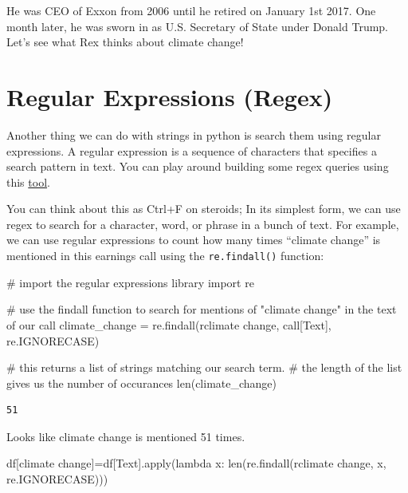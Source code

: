 \documentclass[
  letterpaper,
  DIV=11,
  numbers=noendperiod]{scrreprt}
\newenvironment{Shaded}{\begin{snugshade}}{\end{snugshade}}
\newcommand{\BuiltInTok}[1]{\textcolor[rgb]{0.00,0.23,0.31}{#1}}
\newcommand{\CommentTok}[1]{\textcolor[rgb]{0.37,0.37,0.37}{#1}}
\newcommand{\ImportTok}[1]{\textcolor[rgb]{0.00,0.46,0.62}{#1}}
\newcommand{\KeywordTok}[1]{\textcolor[rgb]{0.00,0.23,0.31}{#1}}
\newcommand{\NormalTok}[1]{\textcolor[rgb]{0.00,0.23,0.31}{#1}}
\newcommand{\OperatorTok}[1]{\textcolor[rgb]{0.37,0.37,0.37}{#1}}
\newcommand{\StringTok}[1]{\textcolor[rgb]{0.13,0.47,0.30}{#1}}
\newcommand{\VerbatimStringTok}[1]{\textcolor[rgb]{0.13,0.47,0.30}{#1}}
\begin{document}
He was CEO of Exxon from 2006 until he retired on January 1st 2017. One
month later, he was sworn in as U.S. Secretary of State under Donald
Trump. Let's see what Rex thinks about climate change!

\hypertarget{regular-expressions-regex}{%
\section{Regular Expressions (Regex)}\label{regular-expressions-regex}}

Another thing we can do with strings in python is search them using
regular expressions. A regular expression is a sequence of characters
that specifies a search pattern in text. You can play around building
some regex queries using this \href{https://regexr.com/}{tool}.

You can think about this as Ctrl+F on steroids; In its simplest form, we
can use regex to search for a character, word, or phrase in a bunch of
text. For example, we can use regular expressions to count how many
times ``climate change'' is mentioned in this earnings call using the
\texttt{re.findall()} function:

\begin{Shaded}
\begin{Highlighting}[]
\CommentTok{\# import the regular expressions library }
\ImportTok{import}\NormalTok{ re}

\CommentTok{\# use the findall function to search for mentions of "climate change" in the text of our call}
\NormalTok{climate\_change }\OperatorTok{=}\NormalTok{ re.findall(}\VerbatimStringTok{r\textquotesingle{}climate change\textquotesingle{}}\NormalTok{, call[}\StringTok{\textquotesingle{}Text\textquotesingle{}}\NormalTok{], re.IGNORECASE)}

\CommentTok{\# this returns a list of strings matching our search term. }
\CommentTok{\# the length of the list gives us the number of occurances}
\BuiltInTok{len}\NormalTok{(climate\_change)}
\end{Highlighting}
\end{Shaded}

\begin{verbatim}
51
\end{verbatim}

Looks like climate change is mentioned 51 times.

\begin{Shaded}
\begin{Highlighting}[]
\NormalTok{df[}\StringTok{\textquotesingle{}climate change\textquotesingle{}}\NormalTok{]}\OperatorTok{=}\NormalTok{df[}\StringTok{\textquotesingle{}Text\textquotesingle{}}\NormalTok{].}\BuiltInTok{apply}\NormalTok{(}\KeywordTok{lambda}\NormalTok{ x: }\BuiltInTok{len}\NormalTok{(re.findall(}\VerbatimStringTok{r\textquotesingle{}climate change\textquotesingle{}}\NormalTok{, x, re.IGNORECASE)))}
\end{Highlighting}
\end{Shaded}
\end{document}
